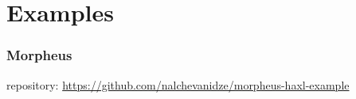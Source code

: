 \section{Examples}

\begin{frame}\frametitle{Morpheus}

repository: \url{https://github.com/nalchevanidze/morpheus-haxl-example}

\end{frame}